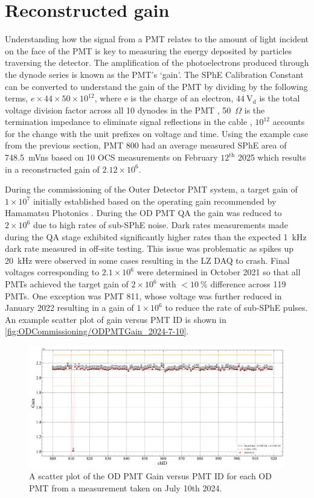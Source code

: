 \section{Reconstructed gain}\label{sec:ODComissioning/RecGain}
Understanding how the signal from a PMT relates to the amount of light incident on the face of the PMT is key to measuring the energy deposited by particles traversing the detector. The amplification of the photoelectrons produced through the dynode series is known as the PMT's `gain'. The SPhE Calibration Constant can be converted to understand the gain of the PMT by dividing by the following terms, $e\times44\times50\times10^{12}$, where e is the charge of an electron, $44~\text{V}_{\text{d}}$ is the total voltage division factor across all 10 dynodes in the PMT \cite{HamamatsuR5912}, 50~$\Omega$ is the termination impedance to eliminate signal reflections in the cable \cite{LZ:2024bvw}, $10^{12}$ accounts for the change with the unit prefixes on voltage and time. Using the example case from the previous section, PMT 800 had an average measured SPhE area of 748.5~mVns based on 10 OCS measurements on February $12^{\text{th}}$ 2025 which results in a reconstructed gain of $2.12\times10^6$.

During the commissioning of the Outer Detector PMT system, a target gain of $1\times10^{7}$ initially established based on the operating gain recommended by Hamamatsu Photonics \cite{LZTDR,HamamatsuR5912}. During the OD PMT QA the gain was reduced to $2\times10^{6}$ due to high rates of sub-SPhE noise. Dark rates measurements made during the QA stage exhibited significantly higher rates than the expected 1~kHz dark rate measured in off-site testing. This issue was problematic as spikes up 20~kHz were observed in some cases resulting in the LZ DAQ to crash. Final voltages corresponding to $2.1\times10^{6}$ were determined in October 2021 so that all PMTs achieved the target gain of $2\times10^6$ with $<10~\%$ difference across 119 PMTs. One exception was PMT 811, whose voltage was further reduced in January 2022 resulting in a gain of $1\times10^6$ to reduce the rate of sub-SPhE pulses.
An example scatter plot of gain versus PMT ID is shown in \autoref{fig:ODCommissioning/ODPMTGain_2024-7-10}.

\begin{figure}
    \centering
    \includegraphics[width=\textwidth]{figures/ODCommissioning/2024-6-12_ODPMT_Gain.pdf}
    \caption{A scatter plot of the OD PMT Gain versus PMT ID for each OD PMT from a measurement taken on July 10th 2024.}
    \label{fig:ODCommissioning/ODPMTGain_2024-7-10}
\end{figure}

